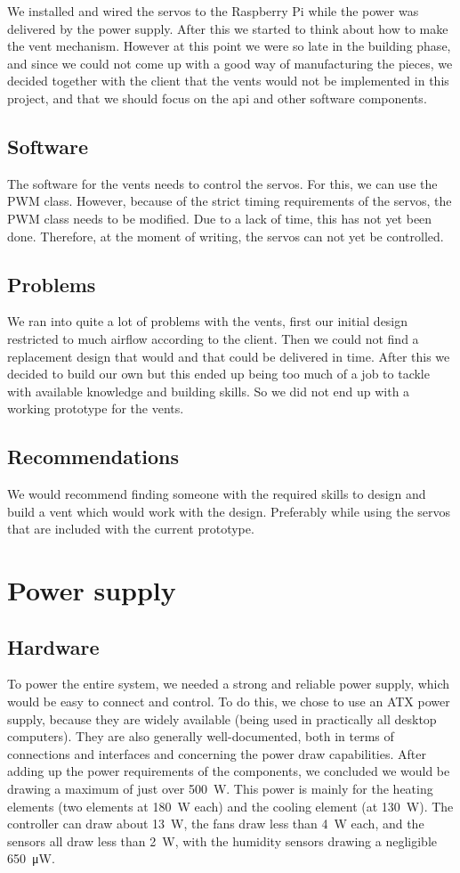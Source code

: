 \documentclass[a4paper,oneside]{book}
\begin{document}
We installed and wired the servos to the Raspberry Pi while the power was
delivered by the power supply. After this we started to think about how to make
the vent mechanism. However at this point we were so late in the building
phase, and since we could not come up with a good way of manufacturing the
pieces, we decided together with the client that the vents would not be
implemented in this project, and that we should focus on the api and other
software components.

\subsection{Software}
The software for the vents needs to control the servos. For this, we can use
the PWM class. However, because of the strict timing requirements of the
servos, the PWM class needs to be modified. Due to a lack of time, this has not
yet been done. Therefore, at the moment of writing, the servos can not yet be
controlled.

\subsection{Problems}
We ran into quite a lot of problems with the vents, first our initial design
restricted to much airflow according to the client. Then we could not find a
replacement design that would and that could be delivered in time. After this
we decided to build our own but this ended up being too much of a job to tackle
with available knowledge and building skills. So we did not end up with a
working prototype for the vents.

\subsection{Recommendations}
We would recommend finding someone with the required skills to design and build
a vent which would work with the design. Preferably while using the servos
that are included with the current prototype.

\section{Power supply}
\subsection{Hardware}
To power the entire system, we needed a strong and reliable power supply, which
would be easy to connect and control. To do this, we chose to use an ATX power
supply, because they are widely available (being used in practically all
desktop computers). They are also generally well-documented, both in terms of
connections and interfaces and concerning the power draw capabilities. After
adding up the power requirements of the components, we concluded we would be
drawing a maximum of just over \SI{500}{\watt}. This power is mainly for the
heating elements (two elements at \SI{180}{\watt} each) and the cooling element
(at \SI{130}{\watt}). The controller can draw about \SI{13}{\watt}, the fans
draw less than \SI{4}{\watt} each, and the sensors all draw less than
\SI{2}{\watt}, with the humidity sensors drawing a negligible
\SI{650}{\micro\watt}.
\end{document}
